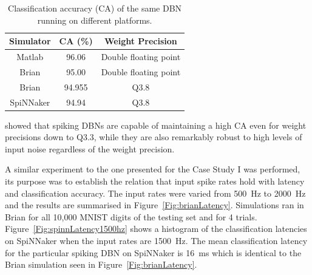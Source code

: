 \begin{table}[h]
\caption{Classification accuracy (CA) of the same DBN running on different platforms.}
\begin{center}
\begin{tabular} {c|c|c}
	Simulator & CA (\%) & Weight Precision \\
    \hline
    Matlab & 96.06 & Double floating point\\
    Brian & 95.00 & Double floating point\\
    Brian & 94.955 & Q3.8\\
    SpiNNaker & 94.94 & Q3.8\\
\end{tabular}
\label{tab:casimulators}
\end{center}
\end{table}


\citet{stromateldbn} showed that spiking DBNs are capable of maintaining a high CA even for weight precisions down to Q3.3, while they are also remarkably robust to high levels of input noise regardless of the weight precision. 


A similar experiment to the one presented for the Case Study I was performed, its purpose was to establish the relation that input spike rates hold with latency and classification accuracy.
The input rates were varied from 500~Hz to 2000~Hz and the results are summarised in Figure~\ref{Fig:brianLatency}. Simulations ran in Brian for all 10,000 MNIST digits of the testing set and for 4 trials. Figure~\ref{Fig:spinnLatency1500hz} shows a histogram of the classification latencies on SpiNNaker when the input rates are 1500~Hz. The mean classification latency for the particular spiking DBN on SpiNNaker is 16~ms which is identical to the Brian simulation seen in Figure~\ref{Fig:brianLatency}.


